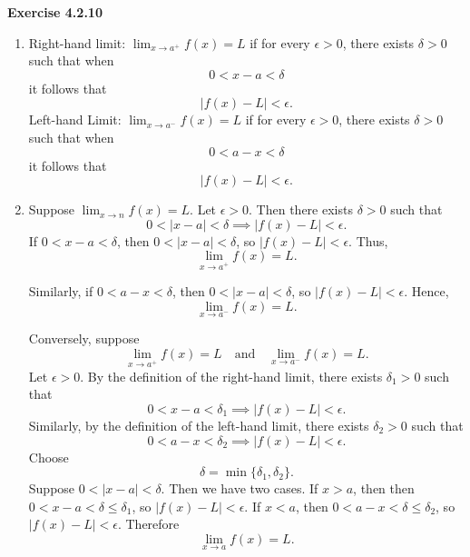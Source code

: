 \documentclass[12pt]{article}
\begin{document}
\textbf{Exercise 4.2.10}
\begin{enumerate}[label=(\alph*)]
    \item Right-hand limit: \( \lim_{x \to a^+} f(x) = L \) if for every \( \epsilon > 0 \), there exists \( \delta > 0 \) such that when
          \[
              0 < x - a < \delta
          \]
          it follows that
          \[
              \vert f(x) - L \vert < \epsilon.
          \]
          Left-hand Limit: \( \lim_{x \to a^-} f(x) = L \) if for every \( \epsilon > 0 \), there exists \( \delta > 0 \) such that when
          \[
              0 < a - x < \delta
          \]
          it follows that
          \[
              \vert f(x) - L \vert < \epsilon.
          \]
    \item Suppose \( \lim_{x \to n} f(x) = L \). Let \( \epsilon > 0 \). Then there exists \( \delta > 0 \) such that
          \[
              0 < \vert x - a \vert < \delta \implies \vert f(x) - L \vert < \epsilon.
          \]
          If \(0<x-a<\delta\), then \(0<|x-a|<\delta\), so \(|f(x)-L|<\epsilon\). Thus,
          \[
              \lim_{x\to a^+}f(x)=L.
          \]

          Similarly, if \(0<a-x<\delta\), then \(0<|x-a|<\delta\), so \(|f(x)-L|<\epsilon\). Hence,
          \[
              \lim_{x\to a^-}f(x)=L.
          \]

          Conversely, suppose
          \[
              \lim_{x\to a^+}f(x)=L
              \quad\text{and}\quad
              \lim_{x\to a^-}f(x)=L.
          \]
          Let \( \epsilon > 0 \). By the definition of the right-hand limit, there exists \(\delta_1>0\) such that
          \[
              0<x-a<\delta_1
              \implies |f(x)-L|<\epsilon.
          \]
          Similarly, by the definition of the left-hand limit, there exists \(\delta_2>0\) such that
          \[
              0<a-x<\delta_2
              \implies |f(x)-L|<\epsilon.
          \]
          Choose
          \[
              \delta=\min\{\delta_1,\delta_2\}.
          \]
          Suppose \( 0 < \vert x - a \vert < \delta \). Then we have two cases. If \( x > a \), then then \(0<x-a<\delta\le\delta_1\), so \(|f(x)-L|<\epsilon\). If \(x<a\), then \(0<a-x<\delta\le\delta_2\), so \(|f(x)-L|<\epsilon\). Therefore
          \[
              \lim_{x \to a} f(x) = L.
          \]
\end{enumerate}
\end{document}
